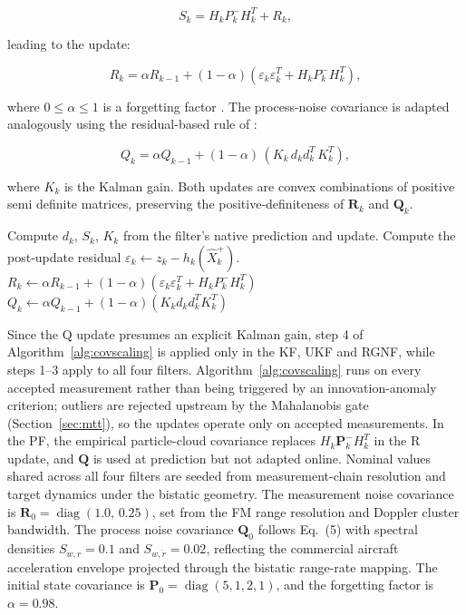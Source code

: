 \documentclass[conference]{IEEEtran}
\begin{document}
\begin{equation}
S_k = H_k P^-_k H_k^T + R_k,
\end{equation}

leading to the update:

\begin{equation}
R_k = \alpha R_{k-1} + (1-\alpha)(\varepsilon_k \varepsilon_k^T + H_k P^-_k H_k^T),
\end{equation}

where $0 \leq \alpha \leq 1$ is a forgetting factor \cite{Akhlaghi2018}. The process-noise covariance is adapted analogously using the residual-based rule of \cite{Akhlaghi2018}:

\begin{equation}
Q_k = \alpha Q_{k-1} + (1-\alpha)\,(K_k\, d_k d_k^T\, K_k^T),
\end{equation}

where $K_k$ is the Kalman gain. Both updates are convex combinations of positive semi definite matrices, preserving the positive-definiteness of $\mathbf{R}_k$ and $\mathbf{Q}_k$.

\begin{algorithm}[t]
\caption{Adaptive Covariance Scaling (per scan $k$)}
\label{alg:covscaling}
\begin{algorithmic}[1]
    \State Compute $d_k$, $S_k$, $K_k$ from the filter's native prediction and update.
    \State Compute the post-update residual $\varepsilon_k \gets z_k - h_k(\hat{X}^+_k)$.
    \State $R_k \gets \alpha R_{k-1} + (1-\alpha)(\varepsilon_k \varepsilon_k^T + H_k P^-_k H_k^T)$
    \State $Q_k \gets \alpha Q_{k-1} + (1-\alpha)(K_k d_k d_k^T K_k^T)$
    \end{algorithmic}
\end{algorithm}

Since the Q update presumes an explicit Kalman gain, step 4 of Algorithm~\ref{alg:covscaling} is applied only in the KF, UKF and RGNF, while steps 1--3 apply to all four filters. Algorithm~\ref{alg:covscaling} runs on every accepted measurement rather than being triggered by an innovation-anomaly criterion; outliers are rejected upstream by the Mahalanobis gate (Section~\ref{sec:mtt}), so the updates operate only on accepted measurements. In the PF, the empirical particle-cloud covariance replaces $H_k \mathbf{P}^-_k H_k^T$ in the R update, and $\mathbf{Q}$ is used at prediction but not adapted online. Nominal values shared across all four filters are seeded from measurement-chain resolution and target dynamics under the bistatic geometry. The measurement noise covariance is $\mathbf{R}_0 = \operatorname{diag}(1.0,\,0.25)$, set from the FM range resolution and Doppler cluster bandwidth. The process noise covariance $\mathbf{Q}_0$ follows Eq.~(5) with spectral densities $S_{w,r} = 0.1$ and $S_{w,\dot{r}} = 0.02$, reflecting the commercial aircraft acceleration envelope projected through the bistatic range-rate mapping. The initial state covariance is $\mathbf{P}_0 = \operatorname{diag}(5, 1, 2, 1)$, and the forgetting factor is $\alpha = 0.98$.
\end{document}
